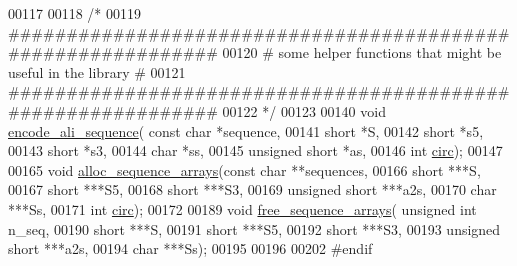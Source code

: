 \begin{DoxyCode}
00117 
00118 \textcolor{comment}{/*}
00119 \textcolor{comment}{#############################################################}
00120 \textcolor{comment}{# some helper functions that might be useful in the library #}
00121 \textcolor{comment}{#############################################################}
00122 \textcolor{comment}{*/}
00123 
00140 \textcolor{keywordtype}{void} \hyperlink{group__consensus__fold_gaa3e40277c837d6f7603afe319884c786}{encode\_ali\_sequence}( \textcolor{keyword}{const} \textcolor{keywordtype}{char} *sequence,
00141                           \textcolor{keywordtype}{short} *S,
00142                           \textcolor{keywordtype}{short} *s5,
00143                           \textcolor{keywordtype}{short} *s3,
00144                           \textcolor{keywordtype}{char} *ss,
00145                           \textcolor{keywordtype}{unsigned} \textcolor{keywordtype}{short} *as,
00146                           \textcolor{keywordtype}{int} \hyperlink{group__model__details_gaf9202a1a09f5828dc731e2d9a10fa111}{circ});
00147 
00165 \textcolor{keywordtype}{void}  \hyperlink{group__consensus__fold_ga8a560930f7f2582cc3967723a86cfdfa}{alloc\_sequence\_arrays}(\textcolor{keyword}{const} \textcolor{keywordtype}{char} **sequences,
00166                             \textcolor{keywordtype}{short} ***S,
00167                             \textcolor{keywordtype}{short} ***S5,
00168                             \textcolor{keywordtype}{short} ***S3,
00169                             \textcolor{keywordtype}{unsigned} \textcolor{keywordtype}{short} ***a2s,
00170                             \textcolor{keywordtype}{char} ***Ss,
00171                             \textcolor{keywordtype}{int} \hyperlink{group__model__details_gaf9202a1a09f5828dc731e2d9a10fa111}{circ});
00172 
00189 \textcolor{keywordtype}{void}  \hyperlink{group__consensus__fold_ga298a420a8c879202e2617b3f724fde38}{free\_sequence\_arrays}( \textcolor{keywordtype}{unsigned} \textcolor{keywordtype}{int} n\_seq,
00190                             \textcolor{keywordtype}{short} ***S,
00191                             \textcolor{keywordtype}{short} ***S5,
00192                             \textcolor{keywordtype}{short} ***S3,
00193                             \textcolor{keywordtype}{unsigned} \textcolor{keywordtype}{short} ***a2s,
00194                             \textcolor{keywordtype}{char} ***Ss);
00195 
00196 
00202 \textcolor{preprocessor}{#endif}
\end{DoxyCode}

